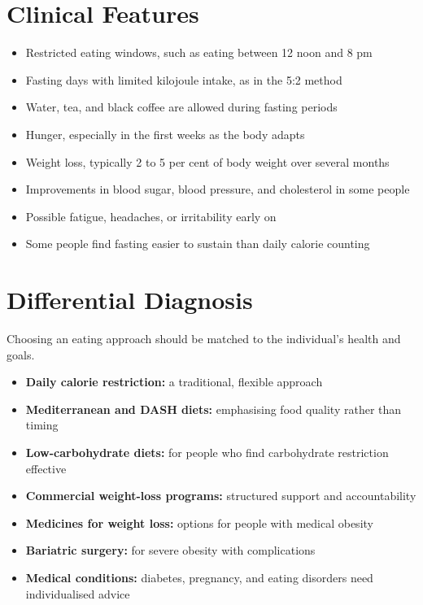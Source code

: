 \section*{Clinical Features}
\begin{itemize}
    \item Restricted eating windows, such as eating between 12 noon and 8 pm
    \item Fasting days with limited kilojoule intake, as in the 5:2 method
    \item Water, tea, and black coffee are allowed during fasting periods
    \item Hunger, especially in the first weeks as the body adapts
    \item Weight loss, typically 2 to 5 per cent of body weight over several months
    \item Improvements in blood sugar, blood pressure, and cholesterol in some people
    \item Possible fatigue, headaches, or irritability early on
    \item Some people find fasting easier to sustain than daily calorie counting
\end{itemize}

\section*{Differential Diagnosis}
Choosing an eating approach should be matched to the individual's health and goals.
\begin{itemize}
    \item \textbf{Daily calorie restriction:} a traditional, flexible approach
    \item \textbf{Mediterranean and DASH diets:} emphasising food quality rather than timing
    \item \textbf{Low-carbohydrate diets:} for people who find carbohydrate restriction effective
    \item \textbf{Commercial weight-loss programs:} structured support and accountability
    \item \textbf{Medicines for weight loss:} options for people with medical obesity
    \item \textbf{Bariatric surgery:} for severe obesity with complications
    \item \textbf{Medical conditions:} diabetes, pregnancy, and eating disorders need individualised advice
\end{itemize}

